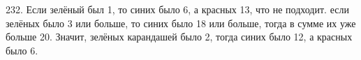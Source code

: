 232. Если зелёный был 1, то синих было 6, а красных 13, что не подходит. если зелёных было 3 или больше, то синих было 18 или больше, тогда в сумме их уже больше 20. Значит, зелёных карандашей было 2, тогда синих было 12, а красных было 6.\\
